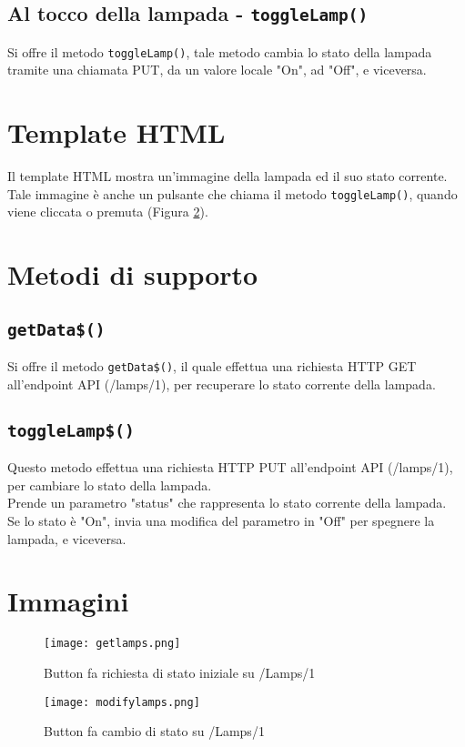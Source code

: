 \subsection{Al tocco della lampada - \texttt{toggleLamp()}}

Si offre il metodo \texttt{toggleLamp()}, tale metodo cambia lo stato della lampada tramite una chiamata PUT, da un valore locale "On", ad "Off", e viceversa.

\section{Template HTML}
Il template HTML mostra un'immagine della lampada ed il suo stato corrente. \\
Tale immagine è anche un pulsante che chiama il metodo \texttt{toggleLamp()}, quando viene cliccata o premuta (Figura \ref{fig:modifylamps}).

\section{Metodi di supporto}

\subsection{\texttt{getData\$()}}
Si offre il metodo \texttt{getData\$()}, il quale effettua una richiesta HTTP GET all'endpoint API (/lamps/1), per recuperare lo stato corrente della lampada.

\subsection{\texttt{toggleLamp\$()}}
Questo metodo effettua una richiesta HTTP PUT all'endpoint API (/lamps/1), per cambiare lo stato della lampada. \\
Prende un parametro "status" che rappresenta lo stato corrente della lampada. \\
Se lo stato è "On", invia una modifica del parametro in "Off" per spegnere la lampada, e viceversa.

\section{Immagini}

\begin{figure}[H]
    \centering
    \texttt{[image: getlamps.png]}
    \caption{Button fa richiesta di stato iniziale su /Lamps/1}
    \label{fig:getlamps}
\end{figure}


\begin{figure}[H]
    \centering
    \texttt{[image: modifylamps.png]}
    \caption{Button fa cambio di stato su /Lamps/1}
    \label{fig:modifylamps}
\end{figure}